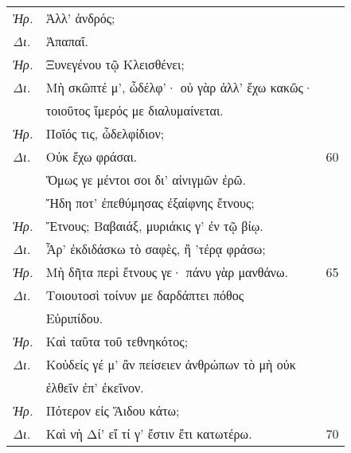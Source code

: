 \documentclass[13pt]{article}
\begin{document}
\begin{greek}
\begin{spacing}{1.5}
\begin{tabularx}{\textwidth}{@{}lXr@{}}
  \textit{Ἡρ.} & Ἀλλ' ἀνδρός; & \\
  \textit{Δι.} & \hspace*{5.5em}Ἀπαπαῖ. & \\
  \textit{Ἡρ.} & \hspace*{9em}Ξυνεγένου τῷ Κλεισθένει; & \\
  \textit{Δι.} & Μὴ σκῶπτέ μ', ὦδέλφ'· οὐ γὰρ ἀλλ' ἔχω κακῶς· & \\
  & τοιοῦτος ἵμερός με διαλυμαίνεται. & \\
  \textit{Ἡρ.} & Ποῖός τις, ὦδελφίδιον; & \\
  \textit{Δι.} & \hspace*{9.5em}Οὐκ ἔχω φράσαι. & 60 \\
  & Ὅμως γε μέντοι σοι δι' αἰνιγμῶν ἐρῶ. & \\
  & Ἤδη ποτ' ἐπεθύμησας ἐξαίφνης ἔτνους; & \\
  \textit{Ἡρ.} & Ἔτνους; Βαβαιάξ, μυριάκις γ' ἐν τῷ βίῳ. & \\
  \textit{Δι.} & Ἆρ' ἐκδιδάσκω τὸ σαφὲς, ἢ 'τέρᾳ φράσω; & \\
  \textit{Ἡρ.} & Μὴ δῆτα περὶ ἔτνους γε· πάνυ γὰρ μανθάνω. & 65 \\
  \textit{Δι.} & Τοιουτοσὶ τοίνυν με δαρδάπτει πόθος & \\
  & Εὐριπίδου. & \\
  \textit{Ἡρ.} & \hspace*{5em}Καὶ ταῦτα τοῦ τεθνηκότος; & \\
  \textit{Δι.} & Κοὐδείς γέ μ' ἂν πείσειεν ἀνθρώπων τὸ μὴ οὐκ & \\
  & ἐλθεῖν ἐπ' ἐκεῖνον. & \\
  \textit{Ἡρ.} & \hspace*{7.5em}Πότερον εἰς Ἅιδου κάτω; & \\
  \textit{Δι.} & Καὶ νὴ Δί' εἴ τί γ' ἔστιν ἔτι κατωτέρω. & 70 \\
\end{tabularx}

\end{spacing}

\newpage


\end{greek}
\end{document}

